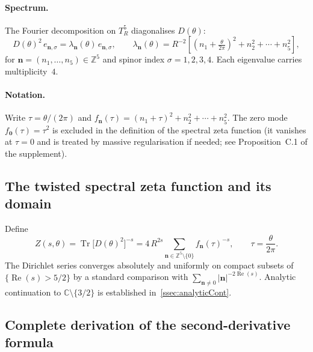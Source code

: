 \paragraph{Spectrum.}
The Fourier decomposition on $T^5_R$ diagonalises $D(\theta)$:
\begin{equation}
  \label{eq:spectrum}
  D(\theta)^2\,e_{\mathbf{n},\sigma}
    = \lambda_{\mathbf{n}}(\theta)\,e_{\mathbf{n},\sigma},
  \qquad
  \lambda_{\mathbf{n}}(\theta)
    = R^{-2}\!\left[\left(n_1+\tfrac{\theta}{2\pi}\right)^2
                   + n_2^2 + \cdots + n_5^2\right],
\end{equation}
for $\mathbf{n}=(n_1,\ldots,n_5)\in\mathbb{Z}^5$ and spinor index
$\sigma=1,2,3,4$.  Each eigenvalue carries multiplicity~$4$.

\paragraph{Notation.}
Write $\tau=\theta/(2\pi)$ and
$f_{\mathbf{n}}(\tau)=(n_1+\tau)^2+n_2^2+\cdots+n_5^2$.
The zero mode $f_{\mathbf{0}}(\tau)=\tau^2$ is excluded in the
definition of the spectral zeta function (it vanishes at $\tau=0$
and is treated by massive regularisation if needed; see
Proposition~C.1 of the supplement).

\subsection{The twisted spectral zeta function and its domain}
\label{ssec:zetaDomain}

Define
\begin{equation}
  \label{eq:ZetaDef}
  Z(s,\theta)
    = \operatorname{Tr}\!\bigl[D(\theta)^2\bigr]^{-s}
    = 4\,R^{2s}
      \sum_{\mathbf{n}\in\mathbb{Z}^5\setminus\{0\}}
      f_{\mathbf{n}}(\tau)^{-s},
  \qquad \tau=\frac{\theta}{2\pi}.
\end{equation}
The Dirichlet series converges absolutely and uniformly on compact
subsets of $\{\operatorname{Re}(s)>5/2\}$ by a standard comparison with
$\sum_{\mathbf{n}\neq 0}|\mathbf{n}|^{-2\operatorname{Re}(s)}$.
Analytic continuation to $\mathbb{C}\setminus\{3/2\}$ is established
in~\cref{ssec:analyticCont}.

\subsection{Complete derivation of the second-derivative formula}
\label{ssec:derivation}

